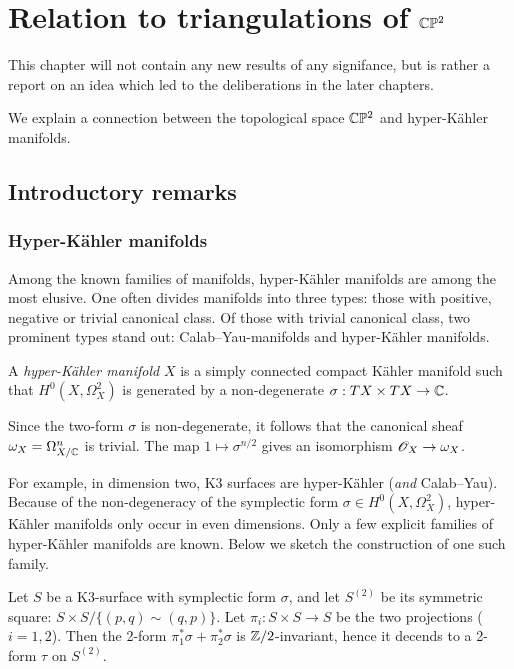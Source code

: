 \chapter{Relation to triangulations of \texorpdfstring{$\mathbb{C}\mathbb{P}^2$}{CP2}}
\label{sec:cp2triangs}

This chapter will not contain any new results of any signifance, but is rather a report on an idea which led to the deliberations in the later chapters.

We explain a connection between the topological space $\mathbb{C} \mathbb{P}^2$ and hyper-Kähler manifolds.

\section{Introductory remarks} %

\subsection{Hyper-Kähler manifolds}
\label{sec:hyper_kähler_manifolds}

Among the known families of manifolds, hyper-Kähler manifolds are among the most elusive. One often divides manifolds into three types: those with positive, negative or trivial canonical class. Of those with trivial canonical class, two prominent types stand out: Calab--Yau-manifolds and hyper-Kähler manifolds.

\begin{definition}
A \emph{hyper-Kähler manifold} $X$ is a simply connected compact Kähler manifold such that $H^0(X, \Omega_X^2)$ is generated by a non-degenerate $\sigma: TX \times TX \to \mathbb{C}$.
\end{definition}

\begin{remark}
Since the two-form $\sigma$ is non-degenerate, it follows that the canonical sheaf $\omega_X=\Omega_{X/\mathbb{C}}^n$ is trivial. The map $1 \mapsto \sigma^{n/2}$ gives an isomorphism $\mathscr{O}_X \to \omega_X$. 
\end{remark}

For example, in dimension two, K3 surfaces are hyper-Kähler (\emph{and} Calab--Yau). Because of the non-degeneracy of the symplectic form $\sigma \in H^0(X, \Omega_X^2)$, hyper-Kähler manifolds only occur in even dimensions. Only a few explicit families of hyper-Kähler manifolds are known. Below we sketch the construction of one such family.

Let $S$ be a K3-surface with symplectic form $\sigma$, and let $S^{(2)}$ be its symmetric square: $S \times S / \{ (p,q) \sim (q,p) \}$. Let $\pi_i:S \times S \to S$ be the two projections ($i=1,2$). Then the 2-form $\pi_1^\ast \sigma + \pi_2^\ast \sigma$ is $\mathbb{Z}/2$-invariant, hence it decends to a 2-form  $\tau$ on $S^{(2)}$.

